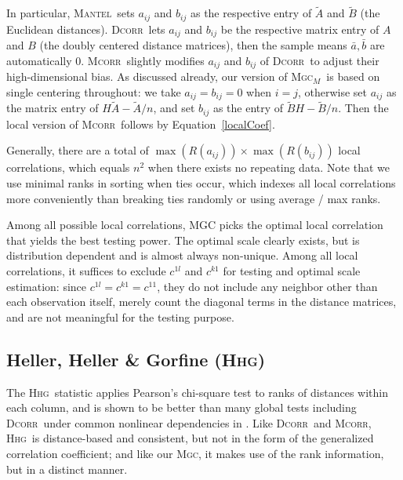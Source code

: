 \documentclass[11pt]{article}
\providecommand{\sct}[1]{{\normalfont\textsc{#1}}}
\newcommand{\G}{c}
\newcommand{\Mgc}{\sct{Mgc}}
\newcommand{\Mgcm}{\sct{Mgc$_M$}}
\newcommand{\Hhg}{\sct{Hhg}}
\newcommand{\Dcorr}{\sct{Dcorr}}
\newcommand{\Mcorr}{\sct{Mcorr}}
\newcommand{\Mantel}{\sct{Mantel}}
\begin{document}
In particular, \Mantel~sets $a_{ij}$ and $b_{ij}$ as the respective entry of $\tilde{A}$ and $\tilde{B}$ (the Euclidean distances). \Dcorr~lets $a_{ij}$ and $b_{ij}$ be the respective matrix entry of $A$ and $B$ (the doubly centered distance matrices), then the sample means $\bar{a}, \bar{b}$ are automatically $0$. \Mcorr~slightly modifies $a_{ij}$ and $b_{ij}$ of \Dcorr~to adjust their high-dimensional bias. As discussed already, our version of \Mgcm~is based on single centering throughout: we take $a_{ij}=b_{ij}=0$ when $i=j$, otherwise set $a_{ij}$ as the matrix entry of $H\tilde{A}-\tilde{A}/n$, and set $b_{ij}$ as the entry of $\tilde{B}H-\tilde{B}/n$. Then the local version of \Mcorr~follows by Equation~\ref{localCoef}.

Generally, there are a total of $\max(R(a_{ij})) \times \max(R(b_{ij}))$ local correlations, which equals $n^2$ when there exists no repeating data. Note that we use minimal ranks in sorting when ties occur, which indexes all local correlations more conveniently than breaking ties randomly or using average / max ranks.

Among all possible local correlations, MGC picks the optimal local correlation that yields the best testing power. The optimal scale clearly exists, but is distribution dependent and is almost always non-unique. Among all local correlations, it suffices to exclude $\G^{1l}$ and $\G^{k1}$ for testing and optimal scale estimation: since $\G^{1l}=\G^{k1}=\G^{11}$, they do not include any neighbor other than each observation itself, merely count the diagonal terms in the distance matrices, and are not meaningful for the testing purpose.


\subsection{Heller, Heller \& Gorfine (\Hhg)}
\label{appen:hhg}
The \Hhg~statistic applies Pearson's chi-square test to ranks of distances within each column, and is shown to be better than many global tests including \Dcorr~under common nonlinear dependencies in \cite{GorfineHellerHeller2012, HellerGorfine2013}. Like \Dcorr~and \Mcorr, \Hhg~is distance-based and consistent, but not in the form of the generalized correlation coefficient; and like our \Mgc, it makes use of the rank information, but in a distinct manner.
\end{document}
